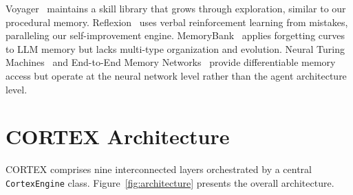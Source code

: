\documentclass[runningheads]{llncs}
\begin{document}
Voyager~\cite{wang2023voyager} maintains a skill library that grows through exploration, similar to our procedural memory. Reflexion~\cite{shinn2023reflexion} uses verbal reinforcement learning from mistakes, paralleling our self-improvement engine. MemoryBank~\cite{hu2024memorybank} applies forgetting curves to LLM memory but lacks multi-type organization and evolution. Neural Turing Machines~\cite{graves2014neural} and End-to-End Memory Networks~\cite{sukhbaatar2015end} provide differentiable memory access but operate at the neural network level rather than the agent architecture level.

\section{CORTEX Architecture}\label{sec:arch}

CORTEX comprises nine interconnected layers orchestrated by a central \texttt{CortexEngine} class. Figure~\ref{fig:architecture} presents the overall architecture.
\end{document}
